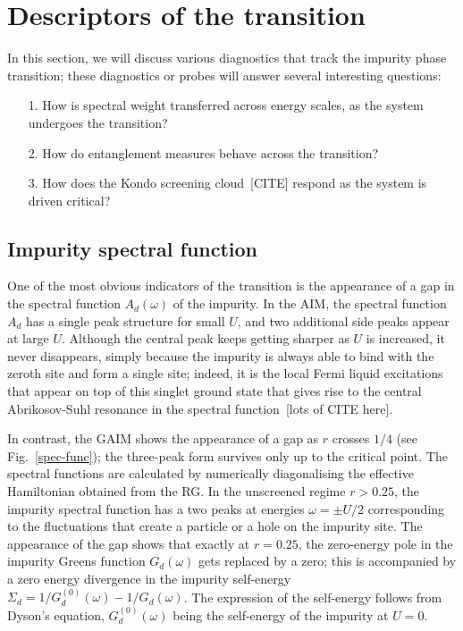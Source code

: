 \documentclass[reprint,superscriptaddress,floatfix]{revtex4-2}
\begin{document}
\section{Descriptors of the transition}
\label{descr}

In this section, we will discuss various diagnostics that track the impurity phase transition; these diagnostics or probes will answer several interesting questions:
\begin{itemize}
	\item[1.] How is spectral weight transferred across energy scales, as the system undergoes the transition?
	\item[2.] How do entanglement measures behave across the transition?
	\item[3.] How does the Kondo screening cloud~\cite{}[CITE] respond as the system is driven critical?
\end{itemize}

\subsection{Impurity spectral function}

One of the most obvious indicators of the transition is the appearance of a gap in the spectral function \(A_d(\omega)\) of the impurity. In the AIM, the spectral function \(A_d\) has a single peak structure for small \(U\), and two additional side peaks appear at large \(U\). Although the central peak keeps getting sharper as \(U\) is increased, it never disappears, simply because the impurity is always able to bind with the zeroth site and form a single site; indeed, it is the local Fermi liquid excitations that appear on top of this singlet ground state that gives rise to the central Abrikosov-Suhl resonance in the spectral function~\cite{}[lots of CITE here].

In contrast, the GAIM shows the appearance of a gap as \(r\) crosses \(1/4\) (see Fig.~\ref{spec-func}); the three-peak form survives only up to the critical point. The spectral functions are calculated by numerically diagonalising the effective Hamiltonian obtained from the RG. In the unscreened regime \(r > 0.25\), the impurity spectral function has a two peaks at energies \(\omega = \pm U/2\) corresponding to the fluctuations that create a particle or a hole on the impurity site. The appearance of the gap shows that exactly at \(r=0.25\), the zero-energy pole in the impurity Greens function \(G_d(\omega)\) gets replaced by a zero; this is accompanied by a zero energy divergence in the impurity self-energy \(\Sigma_d = 1/G_d^{(0)}(\omega) - 1/G_d(\omega)\). The expression of the self-energy follows from Dyson's equation, \(G_d^{(0)}(\omega)\) being the self-energy of the impurity at \(U=0\).
\end{document}
